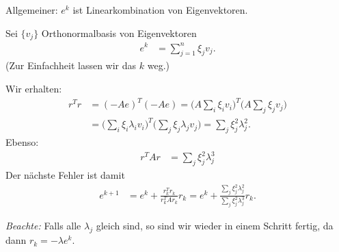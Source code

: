 \begin{center}
\end{center}

Allgemeiner: $e^k$ ist Linearkombination von Eigenvektoren.

Sei $\lbrace v_j \rbrace$ Orthonormalbasis von Eigenvektoren
\begin{align*}
 e^k & =\sum_{j=1}^n \xi_jv_j.
\end{align*}
(Zur Einfachheit lassen wir das $k$ weg.)

Wir erhalten:
\begin{align*}
 r^Tr
 & =
 (-Ae)^T (-Ae) = \bigg(A \sum_i \xi_iv_i \bigg)^T \bigg(A \sum_j \xi_jv_j \bigg) \\
 & = \bigg(\sum_i \xi_i \lambda_iv_i \bigg)^T \bigg(\sum_j \xi_j \lambda_jv_j \bigg)=\sum_j \xi_j^2 \lambda_j^2.
\end{align*}
Ebenso:
\begin{align*}
 r^TAr & =\sum_j \xi_j^2 \lambda_j^3
\end{align*}
Der nächste Fehler ist damit
\begin{align*}
 e^{k+1}
 & =
 e^k+\frac{r_k^Tr_k}{r_k^TAr_k}r_k
 =
 e^k+\frac{\sum_j \xi_j^2 \lambda_j^2}{\sum_j \xi_j^2 \lambda_j^3} r_k.
\end{align*}

\emph{Beachte:} Falls alle $\lambda_j$ gleich sind, so sind wir wieder in einem Schritt fertig, da dann $r_k=-\lambda e^k$.


